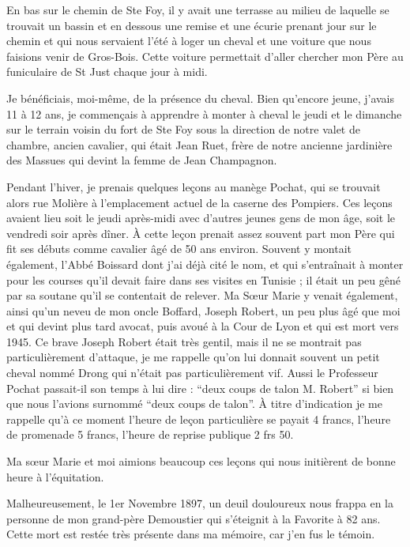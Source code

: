 \documentclass[11pt,a4paper]{report}
\begin{document}
En bas sur le chemin de Ste Foy, il y avait une terrasse au milieu de laquelle se trouvait un bassin et en dessous une remise et une écurie prenant jour sur le chemin et qui nous servaient l'été à loger un cheval et une voiture que nous faisions venir de Gros-Bois. Cette voiture permettait d'aller chercher mon Père au funiculaire de St Just chaque jour à midi.

Je bénéficiais, moi-même, de la présence du cheval. Bien qu'encore jeune, j'avais 11 à 12 ans, je commençais à apprendre à monter à cheval le jeudi et le dimanche sur le terrain voisin du fort de Ste Foy sous la direction de notre valet de chambre, ancien cavalier, qui était Jean Ruet, frère de notre ancienne jardinière des Massues qui devint la femme de Jean Champagnon.

Pendant l'hiver, je prenais quelques leçons au manège Pochat, qui se trouvait alors rue Molière à l'emplacement actuel de la caserne des Pompiers. Ces leçons avaient lieu soit le jeudi après-midi avec d'autres jeunes gens de mon âge, soit le vendredi soir après dîner. À cette leçon prenait assez souvent part mon Père qui fit ses débuts comme cavalier âgé de 50 ans environ. Souvent y montait également, l'Abbé Boissard dont j'ai déjà cité le nom, et qui s'entraînait à monter pour les courses qu'il devait faire dans ses visites en Tunisie ; il était un peu gêné par sa soutane qu'il se contentait de relever. Ma Sœur Marie y venait également, ainsi qu'un neveu de mon oncle Boffard, Joseph Robert, un peu plus âgé que moi et qui devint plus tard avocat, puis avoué à la Cour de Lyon et qui est mort vers 1945. Ce brave Joseph Robert était très gentil, mais il ne se montrait pas particulièrement d'attaque, je me rappelle qu'on lui donnait souvent un petit cheval nommé Drong qui n'était pas particulièrement vif. Aussi le Professeur Pochat passait-il son temps à lui dire : ``deux coups de talon M. Robert'' si bien que nous l'avions surnommé ``deux coups de talon''. À titre d'indication je me rappelle qu'à ce moment l'heure de leçon particulière se payait 4 francs, l'heure de promenade 5 francs, l'heure de reprise publique 2 frs 50.

Ma sœur Marie et moi aimions beaucoup ces leçons qui nous initièrent de bonne heure à l'équitation.

Malheureusement, le 1er Novembre 1897, un deuil douloureux nous frappa en la personne de mon grand-père Demoustier qui s'éteignit à la Favorite à 82 ans. Cette mort est restée très présente dans ma mémoire, car j'en fus le témoin.
\end{document}
